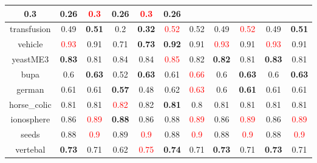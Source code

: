 \documentclass{article}%
\begin{document}
\begin{tabular}{c|cccccccccc}
{0.3
}&0.26&\textcolor{red}{ 
0.3
}&0.26&\textcolor{red}{ 
0.3
}&0.26\\%
\hline%
transfusion&0.49&\textbf{0.51}&0.2&\textbf{0.32}&\textcolor{red}{ 
0.52
}&0.52&0.49&\textcolor{red}{ 
0.52
}&0.49&\textbf{0.51}\\%
\hline%
vehicle&\textcolor{red}{ 
0.93
}&0.91&0.71&\textbf{0.73}&\textbf{0.92}&0.91&\textcolor{red}{ 
0.93
}&0.91&\textcolor{red}{ 
0.93
}&0.91\\%
\hline%
yeastME3&\textbf{0.83}&0.81&0.84&0.84&\textcolor{red}{ 
0.85
}&0.82&\textbf{0.82}&0.81&\textbf{0.83}&0.81\\%
\hline%
bupa&0.6&\textbf{0.63}&0.52&\textbf{0.63}&0.61&\textcolor{red}{ 
0.66
}&0.6&\textbf{0.63}&0.6&\textbf{0.63}\\%
\hline%
german&0.61&0.61&\textbf{0.57}&0.48&0.62&\textcolor{red}{ 
0.63
}&0.6&\textbf{0.61}&0.61&0.61\\%
\hline%
horse\_colic&0.81&0.81&\textcolor{red}{ 
0.82
}&0.82&\textbf{0.81}&0.8&0.81&0.81&0.81&0.81\\%
\hline%
ionosphere&0.86&\textcolor{red}{ 
0.89
}&\textbf{0.88}&0.86&0.88&\textcolor{red}{ 
0.89
}&0.86&\textcolor{red}{ 
0.89
}&0.86&\textcolor{red}{ 
0.89
}\\%
\hline%
seeds&0.88&\textcolor{red}{ 
0.9
}&0.89&\textcolor{red}{ 
0.9
}&0.88&\textcolor{red}{ 
0.9
}&0.88&\textcolor{red}{ 
0.9
}&0.88&\textcolor{red}{ 
0.9
}\\%
\hline%
vertebal&\textbf{0.73}&0.71&0.62&\textcolor{red}{ 
0.75
}&\textbf{0.74}&0.71&\textbf{0.73}&0.71&\textbf{0.73}&0.71\\%
\hline%
\end{tabular}

%
\end{document}
